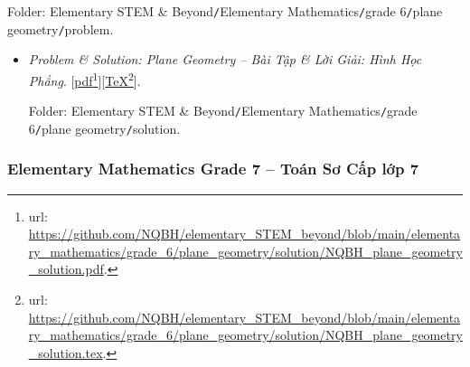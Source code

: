 \documentclass[12pt,oneside]{book}
\begin{document}
\begin{enumerate}
	Folder: {\sf Elementary STEM \& Beyond{\tt/}Elementary Mathematics{\tt/}grade 6{\tt/}plane geometry{\tt/}problem}.
	\begin{itemize}
		\item {\it Problem \& Solution: Plane Geometry -- Bài Tập \& Lời Giải: Hình Học Phẳng}. [\href{https://github.com/NQBH/elementary_STEM_beyond/blob/main/elementary_mathematics/grade_6/plane_geometry/solution/NQBH_plane_geometry_solution.pdf}{pdf}\footnote{{\sc url}: \url{https://github.com/NQBH/elementary_STEM_beyond/blob/main/elementary_mathematics/grade_6/plane_geometry/solution/NQBH_plane_geometry_solution.pdf}.}][\href{https://github.com/NQBH/elementary_STEM_beyond/blob/main/elementary_mathematics/grade_6/plane_geometry/solution/NQBH_plane_geometry_solution.tex}{\TeX}\footnote{{\sc url}: \url{https://github.com/NQBH/elementary_STEM_beyond/blob/main/elementary_mathematics/grade_6/plane_geometry/solution/NQBH_plane_geometry_solution.tex}.}].
		
		Folder: {\sf Elementary STEM \& Beyond{\tt/}Elementary Mathematics{\tt/}grade 6{\tt/}plane geometry{\tt/}solution}.
	\end{itemize}
\end{enumerate}

\subsubsection{Elementary Mathematics Grade 7 -- Toán Sơ Cấp lớp 7}
\end{document}
